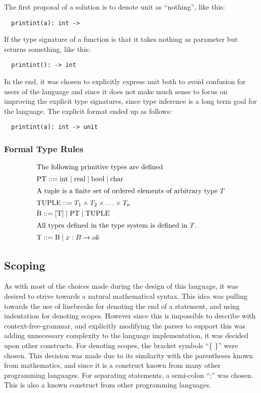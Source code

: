 The first proposal of a solution is to denote unit as \enquote{nothing}, like this:
\begin{verbatim}
  printint(a): int ->
\end{verbatim}
If the type signature of a function is that it takes nothing as parameter but returns something, like this:
\begin{verbatim}
  printint(): -> int
\end{verbatim}

In the end, it was chosen to explicitly express unit both to avoid confusion for users of the language and since it does not make much sense to focus on improving the explicit type signatures, since type inference is a long term goal for the language. The explicit format ended up as follows:
\begin{verbatim}
  printint(a): int -> unit
\end{verbatim}

\subsubsection{Formal Type Rules}

\begin{align*}
\intertext{The following primitive types are defined}
&\text{PT} ::= \text{int} \mid \text{real} \mid \text{bool} \mid \text{char}
\\
\intertext{A tuple is a finite set of ordered elements of arbitrary type $T$}
&\text{TUPLE} ::= T_1 \times T_2 \times \ldots \times T_n
\\            
&\text{B} ::=  \left[ \text{T} \right] \mid \text{PT} \mid \text{TUPLE}
\\            
\intertext{All types defined in the type system is defined in $T$.}
&\text{T} ::= \text{B} \mid x : B \rightarrow ok
\end{align*}

\subsection{Scoping}

As with most of the choices made during the design of this language, it was desired to strive towards a natural mathematical syntax. This idea was pulling towards the use of linebreaks for denoting the end of a statement, and using indentation for denoting scopes. However since this is impossible to describe with context-free-grammar, and explicitly modifying the parser to support this was adding unnecessary complexity to the language implementation, it was decided upon other constructs.
For denoting scopes, the bracket symbols \enquote{\{ \}} were chosen. This decision was made due to its similarity with the parentheses known from mathematics, and since it is a construct known from many other programming languages. For separating statements, a semi-colon \enquote{;} was chosen. This is also a known construct from other programming languages.


